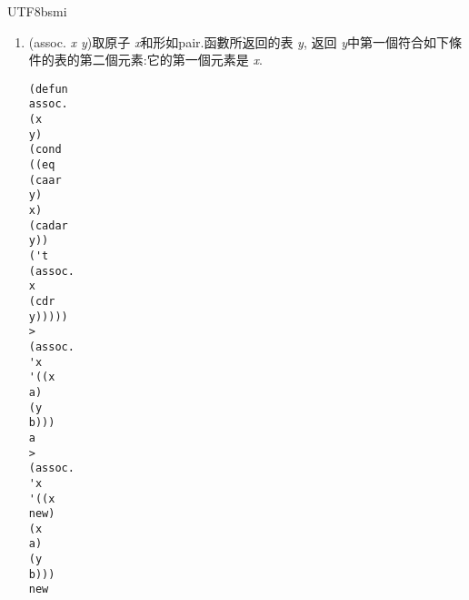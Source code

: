 \documentclass[12pt]{article}
\begin{document}
\begin{CJK}{UTF8}{bsmi}
\begin{enumerate}
應位置的x, y的元素對. 
\begin{verbatim} 
(defun 
pair. 
(x 
y) 
(cond 
((and. 
(null. 
x) 
(null. 
y)) 
'()) 
((and. 
(not. 
(atom 
x)) 
(not. 
(atom 
y))) 
(cons 
(list 
(car 
x) 
(car 
y)) 
(pair. 
(cdr) 
(cdr 
y)))))) 
> 
(pair. 
'(x 
y 
z) 
'(a 
b 
c)) 
((x 
a) 
(y 
b) 
(z 
c)) 
\end{verbatim} 
\item 
(assoc. 
{\it 
x 
y})取原子{\it 
x}和形如pair.函數所返回的表{\it 
y}, 返回{\it 
y}中第一個符合如下條 
件的表的第二個元素:它的第一個元素是{\it 
x}. 
\begin{verbatim} 
(defun 
assoc. 
(x 
y) 
(cond 
((eq 
(caar 
y) 
x) 
(cadar 
y)) 
('t 
(assoc. 
x 
(cdr 
y))))) 
> 
(assoc. 
'x 
'((x 
a) 
(y 
b))) 
a 
> 
(assoc. 
'x 
'((x 
new) 
(x 
a) 
(y 
b))) 
new 
\end{verbatim} 
\end{enumerate} 

\end{CJK}
\end{document}
